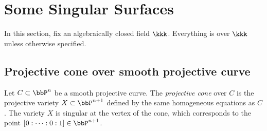 \section{Some Singular Surfaces}

In this section, fix an algebraically closed field \(\kkk\).
Everything is over \(\kkk\) unless otherwise specified.

\subsection{Projective cone over smooth projective curve}

    Let \(C \subset \bbP^n\) be a smooth projective curve.
    The \emph{projective cone} over \(C\) is the projective variety \(X \subset \bbP^{n+1}\) defined by the same homogeneous equations as \(C\).
    The variety \(X\) is singular at the vertex of the cone, which corresponds to the point \([0:\cdots:0:1]\in \bbP^{n+1}\).